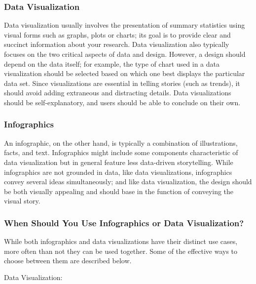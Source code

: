 \documentclass[]{book}
\theoremstyle{definition}
\theoremstyle{definition}
\theoremstyle{definition}
\theoremstyle{remark}
\begin{document}
\subsubsection{Data Visualization}\label{data-visualization}

Data visualization usually involves the presentation of summary
statistics using visual forms such as graphs, plots or charts; its goal
is to provide clear and succinct information about your research. Data
visualization also typically focuses on the two critical aspects of data
and design. However, a design should depend on the data itself; for
example, the type of chart used in a data visualization should be
selected based on which one best displays the particular data set. Since
visualizations are essential in telling stories (such as trends), it
should avoid adding extraneous and distracting details. Data
visualizations should be self-explanatory, and users should be able to
conclude on their own.

\subsubsection{Infographics}\label{infographics}

An infographic, on the other hand, is typically a combination of
illustrations, facts, and text. Infographics might include some
components characteristic of data visualization but in general feature
less data-driven storytelling. While infographics are not grounded in
data, like data visualizations, infographics convey several ideas
simultaneously; and like data visualization, the design should be both
visually appealing and should base in the function of conveying the
visual story.

\subsubsection{When Should You Use Infographics or Data
Visualization?}\label{when-should-you-use-infographics-or-data-visualization}

While both infographics and data visualizations have their distinct use
cases, more often than not they can be used together. Some of the
effective ways to choose between them are described below.

Data Visualization:
\end{document}
